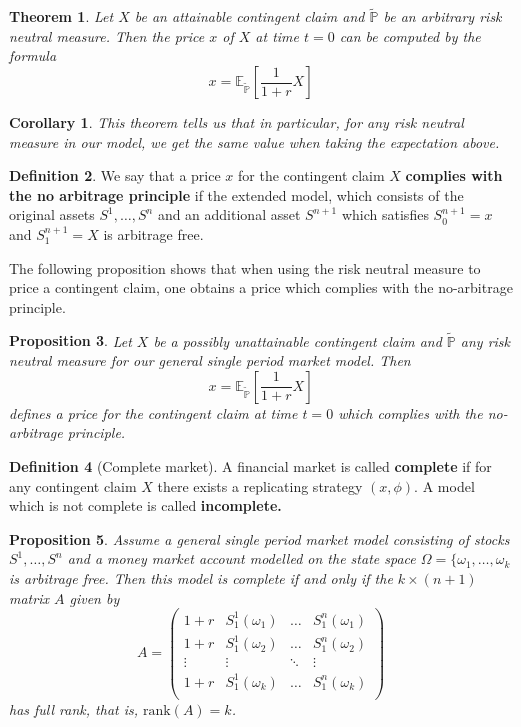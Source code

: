 \documentclass[10pt, oneside, reqno]{amsart}
\theoremstyle{plain}%
\newtheorem{thm}{Theorem}[subsection]
\newtheorem{prop}[thm]{Proposition}
\newtheorem*{cor}{Corollary}
\theoremstyle{definition}
\newtheorem{defn}[thm]{Definition}
\theoremstyle{remark}
\newcommand{\expp}[1]{\mathbb{E}_{\rnm}\left[#1\right]}
\newcommand{\rnm}{\tilde{\mathbb{P}}}
\begin{document}
\begin{thm}
    Let $X$ be an attainable contingent claim and $\rnm$ be an arbitrary risk neutral measure.  Then the price $x$ of $X$ at time $t = 0$ can be computed by the formula \[
        x = \expp{\frac{1}{1+r} X}
    \]
\end{thm}
\begin{cor}
    This theorem tells us that in particular, for any risk neutral measure in our model, we get the same value when taking the expectation above.
\end{cor}


\begin{defn}
    We say that a price $x$ for the contingent claim $X$ \textbf{complies with the no arbitrage principle} if the extended model, which consists of the original assets $S^1,\dots,S^n$ and an additional asset $S^{n+1}$ which satisfies $S^{n+1}_0 = x$ and $S^{n+1}_1 = X$ is arbitrage free.
\end{defn}

The following proposition shows that when using the risk neutral measure to price a contingent claim, one obtains a price which complies with the no-arbitrage principle.

\begin{prop}
    Let $X$ be a possibly unattainable contingent claim and $\rnm$ any risk neutral measure for our general single period market model.  Then \[
        x = \expp{\frac{1}{1+r}X}
    \]
    defines a price for the contingent claim at time $t=0$ which complies with the no-arbitrage principle.
\end{prop}

\begin{defn}[Complete market]
A financial market is called \textbf{complete} if for any contingent claim $X$ there exists a replicating strategy $(x,\phi)$.  A model which is not complete is called \textbf{incomplete.}
\end{defn}


\begin{prop}
    Assume a general single period market model consisting of stocks $S^1, \dots, S^n$
 and a money market account modelled on the state space $\Omega = \{ \omega_1,\dots,\omega_k $ is arbitrage free.  Then this model is complete if and only if the $k \times (n+1)$ matrix $A$ given by \[
    A = \begin{pmatrix}
        1 +r & S^1_1 (\omega_1) & \ldots & S^n_1(\omega_1) \\
        1 +r & S^1_1 (\omega_2) & \ldots & S^n_1(\omega_2) \\
        \vdots & \vdots         & \ddots & \vdots  \\
        1 +r & S^1_1 (\omega_k) & \ldots & S^n_1(\omega_k) \\

    \end{pmatrix}
 \] has full rank, that is, $\text{rank}(A) = k$.
\end{prop}
\end{document}
